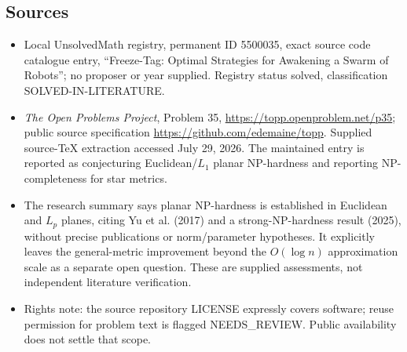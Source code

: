 \documentclass[11pt]{article}
\begin{document}
\subsection{Sources}
\begin{itemize}
\item Local UnsolvedMath registry, permanent ID 5500035, exact source code catalogue entry, ``Freeze-Tag: Optimal Strategies for Awakening a Swarm of Robots''; no proposer or year supplied. Registry status solved, classification SOLVED-IN-LITERATURE.
\item \emph{The Open Problems Project}, Problem 35, \url{https://topp.openproblem.net/p35}; public source specification \url{https://github.com/edemaine/topp}. Supplied source-TeX extraction accessed July 29, 2026. The maintained entry is reported as conjecturing Euclidean/$L_1$ planar NP-hardness and reporting NP-completeness for star metrics.
\item The research summary says planar NP-hardness is established in Euclidean and $L_p$ planes, citing Yu et al. (2017) and a strong-NP-hardness result (2025), without precise publications or norm/parameter hypotheses. It explicitly leaves the general-metric improvement beyond the $O(\log n)$ approximation scale as a separate open question. These are supplied assessments, not independent literature verification.
\item Rights note: the source repository LICENSE expressly covers software; reuse permission for problem text is flagged NEEDS\_REVIEW. Public availability does not settle that scope.
\end{itemize}
\end{document}
